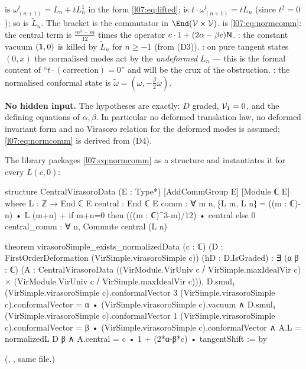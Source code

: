 \begin{dictionary}
 is $\omega^t_{(n+1)} = L_n + tL^1_n$ in the form
\eqref{l07:eq:lifted};  is $t\cdot\omega^t_{(n+1)} = tL_n$ (since $t^2 = 0$);
so  is $\widetilde L_n$. The bracket  is the commutator in $\End(\lsevenV\times\lsevenV)$.
 is \eqref{l07:eq:normcomm}: the central term is
$\frac{m^3-m}{12}$ times the operator $c\cdot1 + (2\alpha-\beta c)\mathsf{N}$. : the
constant vacuum $(\mathbf{1},0)$ is killed by $\widetilde L_n$ for $n\ge-1$ (from (D3)).
: on pure tangent states $(0,x)$ the normalised modes act by the
\emph{undeformed} $L_n$ --- this is the formal content of ``$t\cdot(\text{correction}) = 0$'' and will be
the crux of the obstruction. : the normalised conformal state is
$\widetilde\omega = (\omega,-\frac\beta2\omega)$.

\textbf{No hidden input.} The hypotheses are exactly: $D$ graded, $\mathcal{V}_1 = 0$, and the defining
equations of $\alpha,\beta$. In particular no deformed translation law, no deformed invariant form and
no Virasoro relation for the deformed modes is assumed; \eqref{l07:eq:normcomm} is derived from (D4).
\end{dictionary}

The library packages \eqref{l07:eq:normcomm} as a structure and instantiates it for every
$L(c,0)$:
\begin{leancode}
structure CentralVirasoroData (E : Type*) [AddCommGroup E] [Module ℂ E] where
  L : ℤ → End ℂ E
  central : End ℂ E
  comm : ∀ m n, ⁅L m, L n⁆ = ((m : ℂ)-n) • L (m+n) +
    if m+n=0 then (((m : ℂ)^3-m)/12) • central else 0
  central_comm : ∀ n, Commute central (L n)

theorem virasoroSimple_exists_normalizedData (c : ℂ)
    (D : FirstOrderDeformation (VirSimple.virasoroSimple c)) (hD : D.IsGraded) :
    ∃ (α β : ℂ) (A : CentralVirasoroData
        ((VirModule.VirUniv c ⧸ VirSimple.maxIdealVir c) ×
          (VirModule.VirUniv c ⧸ VirSimple.maxIdealVir c))),
      D.smul₁ (VirSimple.virasoroSimple c).conformalVector 3
        (VirSimple.virasoroSimple c).conformalVector = α • (VirSimple.virasoroSimple c).vacuum ∧
      D.smul₁ (VirSimple.virasoroSimple c).conformalVector 1
        (VirSimple.virasoroSimple c).conformalVector = β • (VirSimple.virasoroSimple c).conformalVector ∧
      A.L = normalizedL D β ∧
      A.central = c • 1 + (2*α-β*c) • tangentShift := by
\end{leancode}
(, , same file.)

